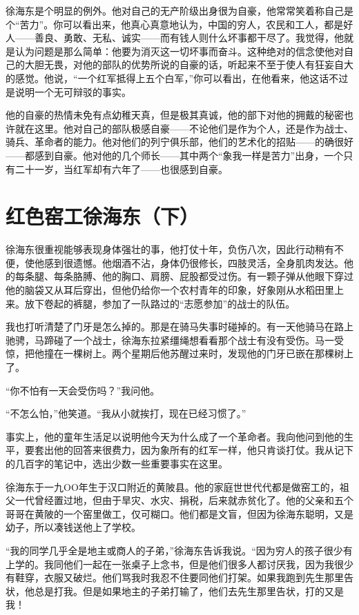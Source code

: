 \documentclass[10pt]{book}
\begin{document}
徐海东是个明显的例外。他对自己的无产阶级出身很为自豪，他常常笑着称自己是个“苦力”。你可以看出来，他真心真意地认为，中国的穷人，农民和工人，都是好人——善良、勇敢、无私、诚实——而有钱人则什么坏事都干尽了。我觉得，他就是认为问题是那么简单：他要为消灭这一切坏事而奋斗。这种绝对的信念使他对自己的大胆无畏，对他的部队的优势所说的自豪的话，听起来不至于使人有狂妄自大的感觉。他说，“一个红军抵得上五个白军，”你可以看出，在他看来，他这话不过是说明一个无可辩驳的事实。

他的自豪的热情未免有点幼稚天真，但是极其真诚，他的部下对他的拥戴的秘密也许就在这里。他对自己的部队极感自豪——不论他们是作为个人，还是作为战士、骑兵、革命者的能力。他对他们的列宁俱乐部，他们的艺术化的招贴——的确很好——都感到自豪。他对他的几个师长——其中两个“象我一样是苦力”出身，一个只有二十一岁，当红军却有六年了——也很感到自豪。

\section{红色窑工徐海东（下）}

徐海东很重视能够表现身体强壮的事，他打仗十年，负伤八次，因此行动稍有不便，使他感到很遗憾。他烟酒不沾，身体仍很修长，四肢灵活，全身肌肉发达。他的每条腿、每条胳膊、他的胸口、肩膀、屁股都受过伤。有一颗子弹从他眼下穿过他的脑袋又从耳后穿出，但他仍给你一个农村青年的印象，好象刚从水稻田里上来。放下卷起的裤腿，参加了一队路过的“志愿参加”的战士的队伍。

我也打听清楚了门牙是怎么掉的。那是在骑马失事时碰掉的。有一天他骑马在路上驰骋，马蹄碰了一个战士，徐海东拉紧缰绳想看看那个战士有没有受伤。马一受惊，把他撞在一棵树上。两个星期后他苏醒过来时，发现他的门牙已嵌在那棵树上了。

“你不怕有一天会受伤吗？”我问他。

“不怎么怕，”他笑道。“我从小就挨打，现在已经习惯了。”

事实上，他的童年生活足以说明他今天为什么成了一个革命者。我向他问到他的生平，要套出他的回答来很费力，因为象所有的红军一样，他只肯谈打仗。我从记下的几百字的笔记中，选出少数一些重要事实在这里。

徐海东于一九OO年生于汉口附近的黄陂县。他的家庭世世代代都是做窑工的，祖父一代曾经置过地，但由于旱灾、水灾、捐税，后来就赤贫化了。他的父亲和五个哥哥在黄陂的一个窑里做工，仅可糊口。他们都是文盲，但因为徐海东聪明，又是幼子，所以凑钱送他上了学校。

“我的同学几乎全是地主或商人的子弟，”徐海东告诉我说。“因为穷人的孩子很少有上学的。我同他们一起在一张桌子上念书，但是他们很多人都讨厌我，因为我很少有鞋穿，衣服又破烂。他们骂我时我忍不住要同他们打架。如果我跑到先生那里告状，他总是打我。但是如果地主的子弟打输了，他们去先生那里告状，打的又是我！
\end{document}
